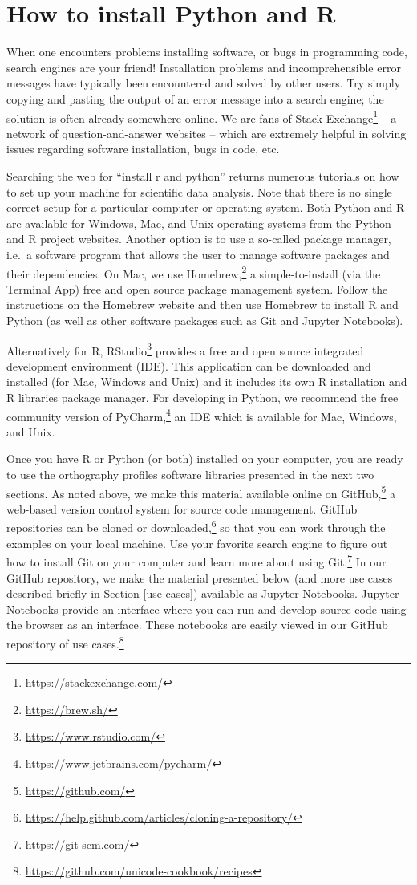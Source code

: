 \section{How to install Python and R}
\label{installing-python-and-r}
When one encounters problems installing software, or bugs in programming code, search engines are your friend! Installation problems and incomprehensible error messages have typically been encountered and solved by other users. Try simply copying and pasting the output of an error message into a search engine; the solution is often already somewhere online. We are fans of Stack Exchange\footnote{\url{https://stackexchange.com/}} -- a network of question-and-answer websites -- which are extremely helpful in solving issues regarding software installation, bugs in code, etc.

Searching the web for ``install r and python'' returns numerous tutorials on how to set up your machine for scientific data analysis. Note that there is no single correct setup for a particular computer or operating system. Both Python and R are available for Windows, Mac, and Unix operating systems from the Python and R project websites. Another option is to use a so-called package manager, i.e.\ a software program that allows the user to manage software packages and their dependencies. On Mac, we use Homebrew,\footnote{\url{https://brew.sh/}} a simple-to-install (via the Terminal App) free and open source package management system. Follow the instructions on the Homebrew website and then use Homebrew to install R and Python (as well as other software packages such as Git and Jupyter Notebooks). 

Alternatively for R, RStudio\footnote{\url{https://www.rstudio.com/}} provides a free and open source integrated development environment (IDE). This application can be downloaded and installed (for Mac, Windows and Unix) and it includes its own R installation and R libraries package manager. For developing in Python, we recommend the free community version of PyCharm,\footnote{\url{https://www.jetbrains.com/pycharm/}} an IDE which is available for Mac, Windows, and Unix. 

Once you have R or Python (or both) installed on your computer, you are ready to use the orthography profiles software libraries presented in the next two sections. As noted above, we make this material available online on GitHub,\footnote{\url{https://github.com/}} a web-based version control system for source code management. GitHub repositories can be cloned or downloaded,\footnote{\url{https://help.github.com/articles/cloning-a-repository/}} so that you can work through the examples on your local machine. Use your favorite search engine to figure out how to install Git on your computer and learn more about using Git.\footnote{\url{https://git-scm.com/}} In our GitHub repository, we make the material presented below (and more use cases described briefly in Section \ref{use-cases}) available as Jupyter Notebooks. Jupyter Notebooks provide an interface where you can run and develop source code using the browser as an interface. These notebooks are easily viewed in our GitHub repository of use cases.\footnote{\url{https://github.com/unicode-cookbook/recipes}}



